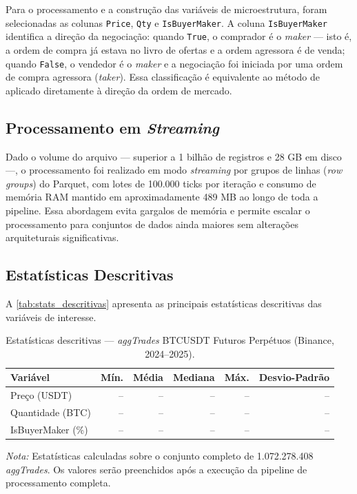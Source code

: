 Para o processamento e a construção das variáveis de microestrutura, foram
selecionadas as colunas \texttt{Price}, \texttt{Qty} e \texttt{IsBuyerMaker}.
A coluna \texttt{IsBuyerMaker} identifica a direção da negociação: quando
\texttt{True}, o comprador é o \textit{maker} — isto é, a ordem de compra já
estava no livro de ofertas e a ordem agressora é de venda; quando
\texttt{False}, o vendedor é o \textit{maker} e a negociação foi iniciada por
uma ordem de compra agressora (\textit{taker}).
Essa classificação é equivalente ao método de \citet{LeeReady1991} aplicado
diretamente à direção da ordem de mercado.

\subsection{Processamento em \textit{Streaming}}
\label{subsec:streaming}

Dado o volume do arquivo — superior a 1 bilhão de registros e 28 GB em disco —,
o processamento foi realizado em modo \textit{streaming} por grupos de linhas
(\textit{row groups}) do Parquet, com lotes de 100.000 ticks por iteração e
consumo de memória RAM mantido em aproximadamente 489 MB ao longo de toda a
pipeline. Essa abordagem evita gargalos de memória e permite escalar o
processamento para conjuntos de dados ainda maiores sem alterações
arquiteturais significativas.

\subsection{Estatísticas Descritivas}
\label{subsec:estatisticas_descritivas}

A \autoref{tab:stats_descritivas} apresenta as principais estatísticas
descritivas das variáveis de interesse.

\begin{table}[ht]
    \centering
    \caption{Estatísticas descritivas — \textit{aggTrades} BTCUSDT Futuros Perpétuos
             (Binance, 2024--2025).}
    \label{tab:stats_descritivas}
    \begin{tabular}{lrrrrr}
        \toprule
        \textbf{Variável} &
        \textbf{Mín.} &
        \textbf{Média} &
        \textbf{Mediana} &
        \textbf{Máx.} &
        \textbf{Desvio-Padrão} \\
        \midrule
        Preço (USDT)         & -- & -- & -- & -- & -- \\
        Quantidade (BTC)     & -- & -- & -- & -- & -- \\
        IsBuyerMaker (\%)    & -- & -- & -- & -- & -- \\
        \bottomrule
    \end{tabular}
    \begin{minipage}{\linewidth}
        \vspace{4pt}
        \footnotesize
        \textit{Nota:} Estatísticas calculadas sobre o conjunto completo de
        1.072.278.408 \textit{aggTrades}. Os valores serão preenchidos após a
        execução da pipeline de processamento completa.
    \end{minipage}
\end{table}

